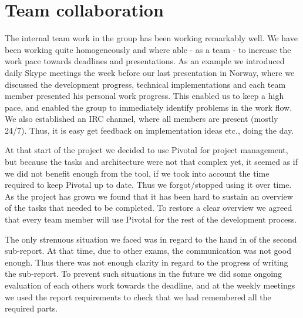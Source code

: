 \section{Team collaboration}
The internal team work in the group has been working remarkably well. We have been
working quite homogeneously and where able - as a team - to increase the work pace towards
deadlines and presentations. As an example we introduced daily Skype meetings
the week before our last presentation in Norway, where we discussed the
development progress, technical implementations and each team member presented his
personal work progress. This enabled us to keep a high pace, and enabled the
group to immediately identify problems in the work flow. We also established
an IRC channel, where all members are present (mostly 24/7). Thus, it is easy
get feedback on implementation ideas etc., doing the day.

At that start of the project we decided to use Pivotal for project management,
but because the tasks and architecture were not that complex yet, it seemed
as if we did not benefit enough from the tool, if we took into account the time
required to keep Pivotal up to date. Thus we forgot/stopped using it over time.
As the project has grown we found that it has been hard to sustain an overview of
the tasks that needed to be completed. To restore a clear overview we 
agreed that every team member will use Pivotal for the rest of the development
process.

The only strenuous situation we faced was in regard to the hand in of the
second sub-report. At that time, due to other exams, the communication was not
good enough. Thus there was not enough clarity in regard to the progress of writing the sub-report. To prevent such situations in the future
we did some ongoing evaluation of each others work towards the
deadline, and at the weekly meetings we used the report requirements to
check that we had remembered all the required parts.
